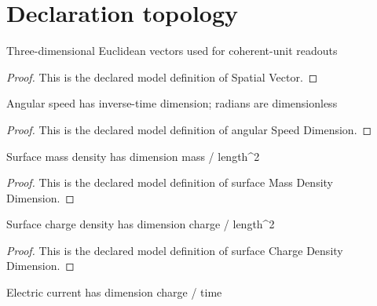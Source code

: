 \section{Declaration topology}
\begin{definition}
  \label{def:physics:phyx-mini-0970:phyxminiproblems-problemphyxmini0970-spatialvector}
  Three-dimensional Euclidean vectors used for coherent-unit readouts
\end{definition}
\begin{proof}
  This is the declared model definition of Spatial Vector.
\end{proof}
\begin{definition}
  \label{def:physics:phyx-mini-0970:phyxminiproblems-problemphyxmini0970-angularspeeddimension}
  Angular speed has inverse-time dimension; radians are dimensionless
\end{definition}
\begin{proof}
  This is the declared model definition of angular Speed Dimension.
\end{proof}
\begin{definition}
  \label{def:physics:phyx-mini-0970:phyxminiproblems-problemphyxmini0970-surfacemassdensitydimension}
  Surface mass density has dimension mass / length\textasciicircum{}2
\end{definition}
\begin{proof}
  This is the declared model definition of surface Mass Density Dimension.
\end{proof}
\begin{definition}
  \label{def:physics:phyx-mini-0970:phyxminiproblems-problemphyxmini0970-surfacechargedensitydimension}
  Surface charge density has dimension charge / length\textasciicircum{}2
\end{definition}
\begin{proof}
  This is the declared model definition of surface Charge Density Dimension.
\end{proof}
\begin{definition}
  \label{def:physics:phyx-mini-0970:phyxminiproblems-problemphyxmini0970-electriccurrentdimension}
  Electric current has dimension charge / time
\end{definition}

